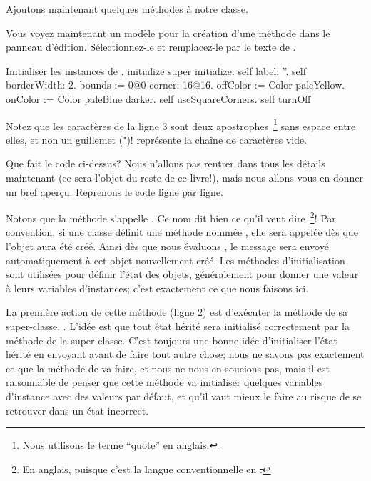 \documentclass[a4paper,10pt,twoside]{book}
\begin{document}
Ajoutons maintenant quelques méthodes à notre classe.

Vous voyez maintenant un modèle pour la création d'une méthode dans le panneau d'édition.
Sélectionnez-le et remplacez-le par le texte de .

\begin{numMethod}[scbecellinitialize]{Initialiser les instances de .}
initialize
   super initialize.
   self label: ''.
   self borderWidth: 2.
   bounds := 0@0 corner: 16@16.
   offColor := Color paleYellow.
   onColor := Color paleBlue darker.
   self useSquareCorners.
   self turnOff
\end{numMethod}

\noindent
Notez que les caractères  de la ligne 3 sont deux
apostrophes~\footnote{Nous utilisons le terme ``quote'' en anglais.} 
sans espace entre elles, et non un guillemet (")!
 représente la chaîne de caractères vide.


Que fait le code ci-dessus?  Nous n'allons pas rentrer dans tous les
détails maintenant (ce sera l'objet du reste de ce livre!), mais nous
allons vous en donner un bref aperçu. Reprenons le code ligne par ligne.

Notons que la méthode s'appelle .
Ce nom dit bien ce qu'il veut dire~\footnote{En anglais, puisque c'est
  la langue conventionnelle en \st.}!
Par convention, si une classe définit une méthode nommée , elle sera appelée dès que l'objet aura été créé.
Ainsi dès que nous évaluons , le message  sera envoyé automatiquement à cet objet nouvellement créé.
Les méthodes d'initialisation sont utilisées pour définir l'état des objets, généralement pour donner une valeur à leurs variables d'instances; c'est exactement ce que nous faisons ici.

La première action de cette méthode (ligne 2) est d'exécuter la méthode  de sa super-classe, .
L'idée est que tout état hérité sera initialisé correctement par la méthode  de la super-classe.
C'est toujours une bonne idée d'initialiser l'état hérité en envoyant
 avant de faire tout autre chose; nous ne savons
pas exactement ce que la méthode  de
 va faire, et nous ne nous en soucions pas, mais
il est raisonnable de penser que cette méthode va initialiser quelques
variables d'instance avec des valeurs par défaut, et qu'il vaut mieux
le faire au risque de se retrouver dans un état incorrect.
\end{document}
